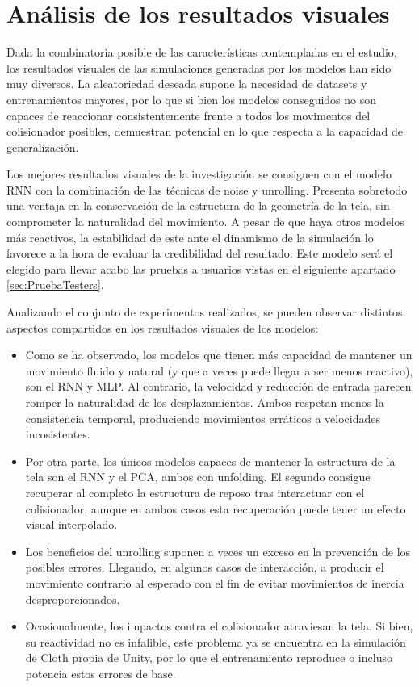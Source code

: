 \section{Análisis de los resultados visuales}
\label{sec:Visual}

Dada la combinatoria posible de las características contempladas en el estudio, los resultados visuales de las simulaciones generadas por los modelos han sido muy diversos. La aleatoriedad deseada supone la necesidad de datasets y entrenamientos mayores, por lo que si bien los modelos conseguidos no son capaces de reaccionar consistentemente frente a todos los movimentos del colisionador posibles, demuestran potencial en lo que respecta a la capacidad de generalización. \newline

Los mejores resultados visuales de la investigación se consiguen con el modelo RNN con la combinación de las técnicas de noise y unrolling. Presenta sobretodo una ventaja en la conservación de la estructura de la geometría de la tela, sin comprometer la naturalidad del movimiento. A pesar de que haya otros modelos más reactivos, la estabilidad de este ante el dinamismo de la simulación lo favorece a la hora de evaluar la credibilidad del resultado. Este modelo será el elegido para llevar acabo las pruebas a usuarios vistas en el siguiente apartado \ref{sec:PruebaTesters}. \newline

Analizando el conjunto de experimentos realizados, se pueden observar distintos aspectos compartidos en los resultados visuales de los modelos:

\begin{itemize}
  \item Como se ha observado, los modelos que tienen más capacidad de mantener un movimiento fluido y natural (y que a veces puede llegar a ser menos reactivo), son el RNN y MLP. Al contrario, la velocidad y reducción de entrada parecen romper la naturalidad de los desplazamientos. Ambos respetan menos la consistencia temporal, produciendo movimientos erráticos a velocidades incosistentes.
  \item Por otra parte, los únicos modelos capaces de mantener la estructura de la tela son el RNN y el PCA, ambos con unfolding. El segundo consigue recuperar al completo la estructura de reposo tras interactuar con el colisionador, aunque en ambos casos esta recuperación puede tener un efecto visual interpolado. 
  \item Los beneficios del unrolling suponen a veces un exceso en la prevención de los posibles errores. Llegando, en algunos casos de interacción, a producir el movimiento contrario al esperado con el fin de evitar movimientos de inercia desproporcionados.
  \item Ocasionalmente, los impactos contra el colisionador atraviesan la tela. Si bien, su reactividad no es infalible, este problema ya se encuentra en la simulación de Cloth propia de Unity, por lo que el entrenamiento reproduce o incluso potencia estos errores de base.
\end{itemize}